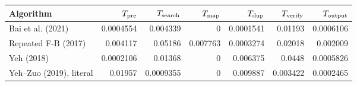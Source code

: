 \begin{tabular}{lrrrrrr}
\toprule
Algorithm & $T_{\rm pre}$ & $T_{\rm search}$ & $T_{\rm map}$ & $T_{\rm dup}$ & $T_{\rm verify}$ & $T_{\rm output}$ \\
\midrule
Bai et al. (2021) & 0.0004554 & 0.004339 & 0 & 0.0001541 & 0.01193 & 0.0006106 \\
Repeated F-B (2017) & 0.004117 & 0.05186 & 0.007763 & 0.0003274 & 0.02018 & 0.002009 \\
Yeh (2018) & 0.0002106 & 0.01368 & 0 & 0.006375 & 0.0448 & 0.0005826 \\
Yeh--Zuo (2019), literal & 0.01957 & 0.0009355 & 0 & 0.009887 & 0.003422 & 0.0002465 \\
\bottomrule
\end{tabular}
